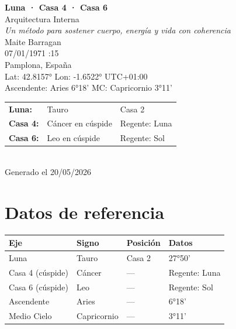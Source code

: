 \documentclass[11pt,a4paper]{article}
\begin{document}
\begin{titlepage}
  \centering
  \vspace*{1.5cm}
  {\Huge\bfseries\color{azulai} Luna · Casa 4 · Casa 6}\\[0.5cm]
  {\large\color{grisai} Arquitectura Interna}\\[0.3cm]
  {\small\itshape\color{grisai} Un método para sostener cuerpo, energía y vida con coherencia}\\[2cm]
  {\huge\color{doradoai} Maite Barragan}\\[1.5cm]
  {\Large 07/01/1971 :15}\\[0.3cm]
  {\Large Pamplona, España}\\[0.3cm]
  {\normalsize Lat: 42.8157° \quad Lon: -1.6522° \quad UTC+01:00}\\[0.3cm]
  {\normalsize Ascendente: Aries 6°18' \quad
    MC: Capricornio 3°11'}\\[2cm]

  \begin{tabular}{lll}
    \textbf{Luna:} & Tauro & Casa 2 \\
    \textbf{Casa 4:} & Cáncer en cúspide & Regente: Luna \\
    \textbf{Casa 6:} & Leo en cúspide & Regente: Sol \\
  \end{tabular}\\[2cm]

  \vfill
  {\small Generado el 20/05/2026}
\end{titlepage}

\tableofcontents
\clearpage

\section{Datos de referencia}

\begin{center}
\begin{tabular}{llll}
  \toprule
  \textbf{Eje} & \textbf{Signo} & \textbf{Posición} & \textbf{Datos} \\
  \midrule
  Luna & Tauro & Casa 2 & 27°50' \\
  Casa 4 (cúspide) & Cáncer & --- & Regente: Luna \\
  Casa 6 (cúspide) & Leo & --- & Regente: Sol \\
  Ascendente & Aries & --- & 6°18' \\
  Medio Cielo & Capricornio & --- & 3°11' \\
  \bottomrule
\end{tabular}
\end{center}
\end{document}
